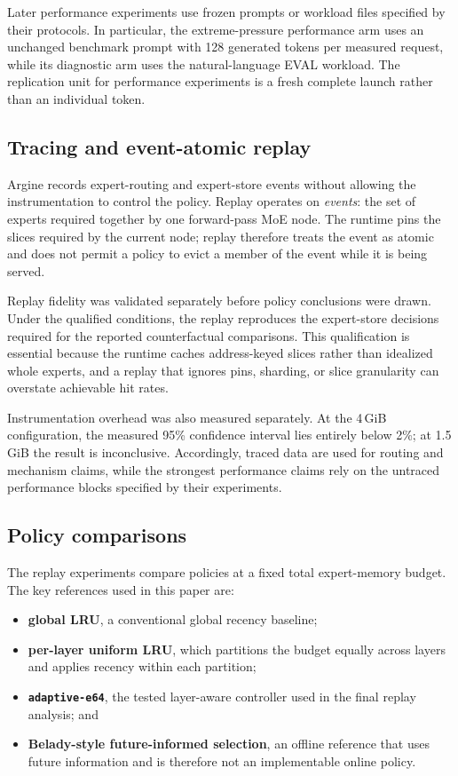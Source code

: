 Later performance experiments use frozen prompts or workload files specified by their protocols. In particular, the extreme-pressure performance arm uses an unchanged benchmark prompt with 128 generated tokens per measured request, while its diagnostic arm uses the natural-language EVAL workload. The replication unit for performance experiments is a fresh complete launch rather than an individual token.

\subsection{Tracing and event-atomic replay}

Argine records expert-routing and expert-store events without allowing the instrumentation to control the policy. Replay operates on \emph{events}: the set of experts required together by one forward-pass MoE node. The runtime pins the slices required by the current node; replay therefore treats the event as atomic and does not permit a policy to evict a member of the event while it is being served.

Replay fidelity was validated separately before policy conclusions were drawn. Under the qualified conditions, the replay reproduces the expert-store decisions required for the reported counterfactual comparisons. This qualification is essential because the runtime caches address-keyed slices rather than idealized whole experts, and a replay that ignores pins, sharding, or slice granularity can overstate achievable hit rates.

Instrumentation overhead was also measured separately. At the 4\,GiB configuration, the measured 95\% confidence interval lies entirely below 2\%; at 1.5\,GiB the result is inconclusive. Accordingly, traced data are used for routing and mechanism claims, while the strongest performance claims rely on the untraced performance blocks specified by their experiments.

\subsection{Policy comparisons}

The replay experiments compare policies at a fixed total expert-memory budget. The key references used in this paper are:
\begin{itemize}
    \item \textbf{global LRU}, a conventional global recency baseline;
    \item \textbf{per-layer uniform LRU}, which partitions the budget equally across layers and applies recency within each partition;
    \item \textbf{\texttt{adaptive-e64}}, the tested layer-aware controller used in the final replay analysis; and
    \item \textbf{Belady-style future-informed selection}, an offline reference that uses future information and is therefore not an implementable online policy.
\end{itemize}

